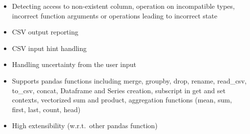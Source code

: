 \large
%

\begin{itemize}
    \item Detecting access to non-existent column, operation on incompatible types, incorrect function arguments or
    operations leading to incorrect state
    \item CSV output reporting
    \item CSV input hint handling
    \item Handling uncertainty from the user input
    \item Supports pandas functions including merge, groupby, drop, rename, read\_csv, to\_csv, concat, Dataframe
    and Series creation, subscript in get and set contexts, vectorized sum and product, aggregation functions (mean, sum,
    first, last, count, head)
    \item High extensibility (w.r.t.\ other pandas function)
\end{itemize}